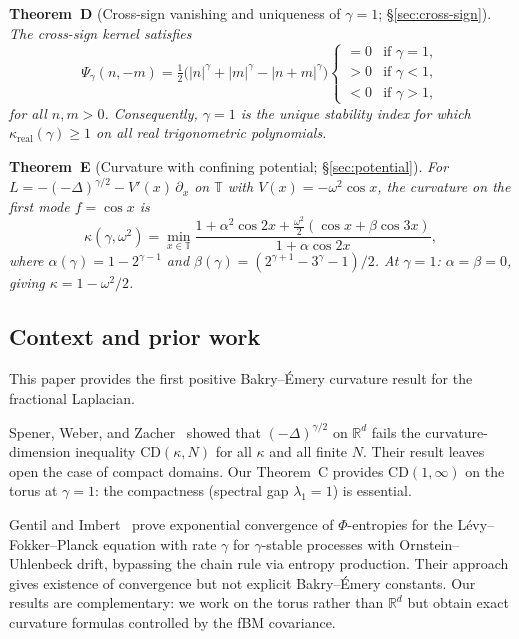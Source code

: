 \documentclass[11pt,a4paper]{article}
\theoremstyle{plain}
\theoremstyle{definition}
\theoremstyle{remark}
\newcommand{\R}{\mathbb{R}}
\newcommand{\T}{\mathbb{T}}
\begin{document}
\medskip\noindent
\textbf{Theorem~D} (Cross-sign vanishing and uniqueness of $\gamma=1$; \S\ref{sec:cross-sign}).
\emph{The cross-sign kernel satisfies
\begin{equation}\label{eq:intro-D}
  \Psi_\gamma(n,-m) = \tfrac{1}{2}\bigl(|n|^\gamma + |m|^\gamma
  - |n+m|^\gamma\bigr)
  \begin{cases}
    = 0 & \text{if } \gamma = 1, \\
    > 0 & \text{if } \gamma < 1, \\
    < 0 & \text{if } \gamma > 1,
  \end{cases}
\end{equation}
for all $n,m > 0$. Consequently, $\gamma = 1$ is the unique stability
index for which $\kappa_{\mathrm{real}}(\gamma) \geq 1$ on all real
trigonometric polynomials.}

\medskip\noindent
\textbf{Theorem~E} (Curvature with confining potential; \S\ref{sec:potential}).
\emph{For $L = -(-\Delta)^{\gamma/2} - V'(x)\,\partial_x$ on $\T$ with
$V(x) = -\omega^2\cos x$, the curvature on the first mode
$f = \cos x$ is
\begin{equation}\label{eq:intro-E}
  \kappa(\gamma,\omega^2) = \min_{x \in \T}
  \frac{1 + \alpha^2\cos 2x + \tfrac{\omega^2}{2}(\cos x + \beta\cos 3x)}
       {1 + \alpha\cos 2x},
\end{equation}
where $\alpha(\gamma) = 1 - 2^{\gamma-1}$ and
$\beta(\gamma) = (2^{\gamma+1} - 3^\gamma - 1)/2$.
At $\gamma = 1$: $\alpha = \beta = 0$, giving $\kappa = 1 - \omega^2/2$.}


\subsection{Context and prior work}

This paper provides the first positive Bakry--\'Emery curvature
result for the fractional Laplacian.

Spener, Weber, and Zacher~\cite{SpenerWeberZacher2020} showed that
$(-\Delta)^{\gamma/2}$ on $\R^d$ fails the curvature-dimension inequality
$\mathrm{CD}(\kappa,N)$ for all $\kappa$ and all finite $N$. Their result
leaves open the case of compact domains. Our Theorem~C provides
$\mathrm{CD}(1,\infty)$ on the torus at $\gamma = 1$: the compactness
(spectral gap $\lambda_1 = 1$) is essential.

Gentil and Imbert~\cite{GentilImbert2008} prove exponential convergence
of $\Phi$-entropies for the L\'evy--Fokker--Planck equation with rate
$\gamma$ for $\gamma$-stable processes with Ornstein--Uhlenbeck drift,
bypassing the chain rule via entropy production. Their approach gives
existence of convergence but not explicit Bakry--\'Emery constants.
Our results are complementary: we work on the torus rather than $\R^d$
but obtain exact curvature formulas controlled by the fBM covariance.
\end{document}
